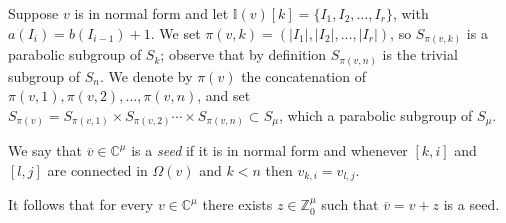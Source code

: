 \documentclass[11pt,fleqn]{amsart}
\newcounter{para}[section]
\newcommand\CC{\mathbb C}
\newcommand\ZZ{\mathbb Z}
\newcommand\vv{\overline{v}}
\newcommand\II{\mathbb I}
\newcommand\abs[1]{|#1|}
\begin{document}
Suppose $v$ is in normal form and let $\II(v)[k] = \{I_1, I_2, \ldots, I_r\}$, 
with $a(I_i) = b(I_{i-1}) + 1$. We set $\pi(v,k) = (\abs{I_1},\abs{I_2}, 
\ldots, \abs{I_r})$, so $S_{\pi(v,k)}$ is a parabolic subgroup of $S_k$; 
observe that by definition $S_{\pi(v,n)}$ is the trivial subgroup of $S_n$. 
We denote by $\pi(v)$ the concatenation of $\pi(v,1), \pi(v,2), \ldots,
\pi(v,n)$, and set $S_{\pi(v)} = S_{\pi(v,1)} \times S_{\pi(v,2)} \cdots 
\times S_{\pi(v,n)} \subset S_\mu$, which a parabolic subgroup of $S_\mu$.
\begin{Definition}
We say that $\vv \in \CC^\mu$ is a \emph{seed} if it is in normal form and 
whenever $[k,i]$ and $[l,j]$ are connected in $\Omega(v)$ and $k < n$ then
$v_{k,i} = v_{l,j}$.
\end{Definition}
It follows that for every $v \in \CC^\mu$ there exists $z \in \ZZ^\mu_0$ such
that $\vv = v + z$ is a seed.
\end{document}
